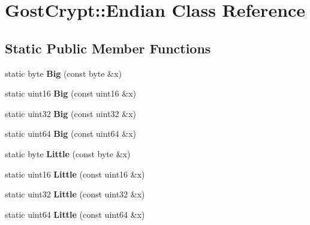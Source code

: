 \hypertarget{class_gost_crypt_1_1_endian}{}\section{Gost\+Crypt\+:\+:Endian Class Reference}
\label{class_gost_crypt_1_1_endian}
\subsection*{Static Public Member Functions}
\begin{DoxyCompactItemize}
\item 
\mbox{\label{class_gost_crypt_1_1_endian_a68915f3da0a2ac08cc8ddf4002f750a8}} 
static byte {\bfseries Big} (const byte \&x)
\item 
\mbox{\label{class_gost_crypt_1_1_endian_a1f94a2d8926c1e91aec88b4e4b8d23f6}} 
static uint16 {\bfseries Big} (const uint16 \&x)
\item 
\mbox{\label{class_gost_crypt_1_1_endian_a3118e820e0499f0c9295292cbd9757bd}} 
static uint32 {\bfseries Big} (const uint32 \&x)
\item 
\mbox{\label{class_gost_crypt_1_1_endian_ab4a04680779a3e43f9b41c2e827a3839}} 
static uint64 {\bfseries Big} (const uint64 \&x)
\item 
\mbox{\label{class_gost_crypt_1_1_endian_aaee0b73f7b8b3e0dbd45f513a2dd2335}} 
static byte {\bfseries Little} (const byte \&x)
\item 
\mbox{\label{class_gost_crypt_1_1_endian_acf5adbe3691fdb3e24798aec108059e6}} 
static uint16 {\bfseries Little} (const uint16 \&x)
\item 
\mbox{\label{class_gost_crypt_1_1_endian_a3ed105703c3d47be1bb38d7fd273f1d1}} 
static uint32 {\bfseries Little} (const uint32 \&x)
\item 
\mbox{\label{class_gost_crypt_1_1_endian_a534aa2cfa370d7acd8ce44715c47eac7}} 
static uint64 {\bfseries Little} (const uint64 \&x)
\end{DoxyCompactItemize}
